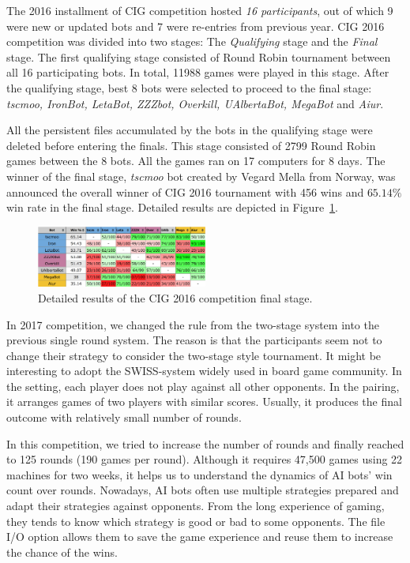 The 2016 installment of CIG competition hosted {\em 16 participants}, out of which 9 were new or updated bots and 7 were re-entries from previous year. CIG 2016 competition was divided into two stages: The {\em Qualifying} stage and the {\em Final} stage. The first qualifying stage consisted of Round Robin tournament between all 16 participating bots. In total, 11988 games were played in this stage. After the qualifying stage, best 8 bots were selected to proceed to the final stage: {\em tscmoo, IronBot, LetaBot, ZZZbot, Overkill, UAlbertaBot, MegaBot} and {\em Aiur}.

All the persistent files accumulated by the bots in the qualifying stage were deleted before entering the finals. This stage consisted of 2799 Round Robin games between the 8 bots. All the games ran on 17 computers for 8 days. The winner of the final stage, {\em tscmoo} bot created by Vegard Mella from Norway, was announced the overall winner of CIG 2016 tournament with 456 wins and $65.14\%$ win rate in the final stage. Detailed results are depicted in Figure~\ref{figCIGresults}. 

\begin{figure}[h]
  \centering
  \includegraphics[width=0.5\textwidth]{fig/cig-results.png}
  \caption{Detailed results of the CIG 2016 competition final stage.}
  \label{figCIGresults}
\end{figure}

In 2017 competition, we changed the rule from the two-stage system into the previous single round system. The reason is that the participants seem not to change their strategy to consider the two-stage style tournament. It might be interesting to adopt the SWISS-system widely used in board game community. In the setting, each player does not play against all other opponents. In the pairing, it arranges games of two players with similar scores. Usually, it produces the final outcome with relatively small number of rounds. 

In this competition, we tried to increase the number of rounds and finally reached to 125 rounds (190 games per round). Although it requires 47,500 games using 22 machines for two weeks, it helps us to understand the dynamics of AI bots' win count over rounds. Nowadays, AI bots often use multiple strategies prepared and adapt their strategies against opponents. From the long experience of gaming, they tends to know which strategy is good or bad to some opponents. The file I/O option allows them to save the game experience and reuse them to increase the chance of the wins. 

